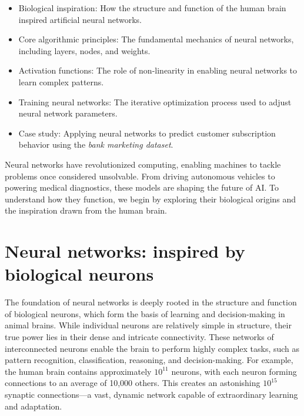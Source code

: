 \documentclass[
]{book}
\providecommand{\tightlist}{%
  \setlength{\itemsep}{0pt}\setlength{\parskip}{0pt}}
\theoremstyle{definition}
\theoremstyle{definition}
\theoremstyle{definition}
\theoremstyle{definition}
\theoremstyle{remark}
\begin{document}
\begin{itemize}
\tightlist
\item
  Biological inspiration: How the structure and function of the human brain inspired artificial neural networks.\\
\item
  Core algorithmic principles: The fundamental mechanics of neural networks, including layers, nodes, and weights.\\
\item
  Activation functions: The role of non-linearity in enabling neural networks to learn complex patterns.\\
\item
  Training neural networks: The iterative optimization process used to adjust neural network parameters.\\
\item
  Case study: Applying neural networks to predict customer subscription behavior using the \emph{bank marketing dataset}.
\end{itemize}

Neural networks have revolutionized computing, enabling machines to tackle problems once considered unsolvable. From driving autonomous vehicles to powering medical diagnostics, these models are shaping the future of AI. To understand how they function, we begin by exploring their biological origins and the inspiration drawn from the human brain.

\section{Neural networks: inspired by biological neurons}\label{neural-networks-inspired-by-biological-neurons}

The foundation of neural networks is deeply rooted in the structure and function of biological neurons, which form the basis of learning and decision-making in animal brains. While individual neurons are relatively simple in structure, their true power lies in their dense and intricate connectivity. These networks of interconnected neurons enable the brain to perform highly complex tasks, such as pattern recognition, classification, reasoning, and decision-making. For example, the human brain contains approximately \(10^{11}\) neurons, with each neuron forming connections to an average of 10,000 others. This creates an astonishing \(10^{15}\) synaptic connections---a vast, dynamic network capable of extraordinary learning and adaptation.
\end{document}
